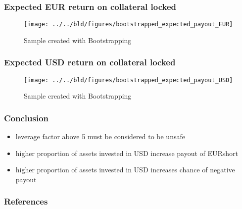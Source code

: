 \documentclass[11pt]{beamer}
\begin{document}
\begin{frame}[t]
    \frametitle{Expected EUR return on collateral locked}
    \begin{figure}
        \caption{Sample created with Bootstrapping}
        \texttt{[image: ../../bld/figures/bootstrapped\_expected\_payout\_EUR]}
    \end{figure}
\end{frame}

\begin{frame}[t]
    \frametitle{Expected USD return on collateral locked}
    \begin{figure}
        \caption{Sample created with Bootstrapping}
        \texttt{[image: ../../bld/figures/bootstrapped\_expected\_payout\_USD]}
    \end{figure}
\end{frame}

\begin{frame}[t]
    \frametitle{Conclusion}
    \begin{itemize}
        \item leverage factor above 5 must be considered to be unsafe
        \item higher proportion of assets invested in USD increase payout of EURshort
        \item higher proportion of assets invested in USD increases chance of negative payout
    \end{itemize}

    \note{~}
\end{frame}

 {
    \begin{frame}
        \frametitle{}
    \end{frame}

}

\begin{frame}[allowframebreaks]
    \frametitle{References}

    \renewcommand{\bibfont}{\normalfont\footnotesize}
    \printbibliography

\end{frame}
\end{document}
